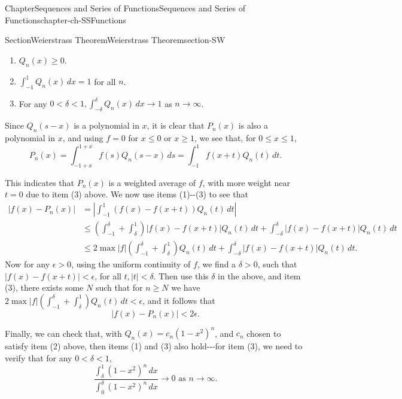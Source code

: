 \documentclass[oneside,10pt,]{book}
\numberwithin{equation}{section}
\newcommand{\amp}{&}
\begin{document}
\begin{chapterptx}{Chapter}{Sequences and Series of Functions}{}{Sequences and Series of Functions}{}{}{chapter-ch-SSFunctions}
\begin{sectionptx}{Section}{Weierstrass Theorem}{}{Weierstrass Theorem}{}{}{section-SW}
\begin{enumerate}
\item{}\(Q_{n}(x) \ge 0\).%
\item{}\(\int_{-1}^{1} Q_{n}(x)\, dx =1\) for all \(n\).%
\item{}For any \(0 < \delta < 1, \int_{-\delta}^{\delta} Q_{n}(x)\, dx \to 1\) as \(n\to \infty\).%
\end{enumerate}
%
\par
Since \(Q_{n}(s-x)\) is a polynomial in \(x\), it is clear that \(P_{n}(x)\) is also a polynomial in \(x\), and using \(f=0\) for \(x\le 0\) or \(x\ge 1\), we see that, for \(0\le x \le 1\),%
\begin{equation*}
P_{n}(x)= \int_{-1+x}^{1+x} f(s)Q_{n}(s-x)\, ds= \int_{-1}^{1} f(x+t) Q_{n}(t)\, dt.
\end{equation*}
%
\par
This indicates that \(P_{n}(x)\) is a weighted average of \(f\), with more weight near \(t=0\) due to item (3) above. We now use items (1)-{}-{}(3) to see that%
\begin{align*}
|f(x)-P_{n}(x)|\amp =\left| \int_{-1}^{1} \left(f(x)-f(x+t)\right) Q_{n}(t)\, dt\right|\\
\amp \le \left(\int_{-1}^{\delta} + \int_{\delta}^{1} \right) |f(x)-f(x+t)|Q_{n}(t) \, dt +
\int_{-\delta}^{\delta} |f(x)-f(x+t)|Q_{n}(t) \, dt\\
\amp \le 2 \max |f| \left(\int_{-1}^{\delta} + \int_{\delta}^{1} \right) Q_{n}(t) \, dt +
\int_{-\delta}^{\delta} |f(x)-f(x+t)|Q_{n}(t) \, dt.
\end{align*}
Now for any \(\epsilon>0\), using the uniform continuity of \(f\), we find a \(\delta >0\), such that \(|f(x)-f(x+t)| < \epsilon \), for all \(t, 
|t| < \delta\). Then use this \(\delta\) in the above, and item (3), there exists some \(N\) such that for \(n\ge N\) we have \(2 \max |f| \left(\int_{-1}^{\delta} + \int_{\delta}^{1} \right) Q_{n}(t) \, dt < \epsilon\), and it follows that%
\begin{equation*}
|f(x)-P_{n}(x)| < 2\epsilon.
\end{equation*}
%
\par
Finally, we can check that, with \(Q_{n}(x)=c_{n}(1-x^{2})^{n}\), and \(c_{n}\) chosen to satisfy item (2) above, then items (1) and (3) also hold-{}-{}-for item (3), we need to  verify that for any \(0 < \delta < 1\),%
\begin{equation*}
\frac{\int_{\delta}^{1} (1-x^{2})^{n}\, dx}{ \int_{0}^{\delta} (1-x^{2})^{n}\, dx}\to 0 \text{ as }
n\to \infty.

\end{equation*}
\end{sectionptx}
\end{chapterptx}
\end{document}
